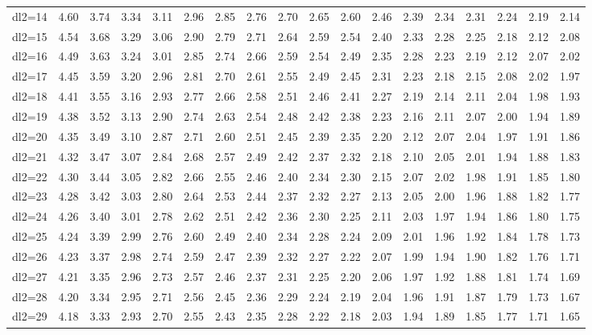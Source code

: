 \documentclass[
  11pt,
  french,
]{book}
\begin{document}
\begin{table}
\begin{tabular}[t]{lrrrrrrrrrrrrrrrrr}
dl2=14 & 4.60 & 3.74 & 3.34 & 3.11 & 2.96 & 2.85 & 2.76 & 2.70 & 2.65 & 2.60 & 2.46 & 2.39 & 2.34 & 2.31 & 2.24 & 2.19 & 2.14\\
dl2=15 & 4.54 & 3.68 & 3.29 & 3.06 & 2.90 & 2.79 & 2.71 & 2.64 & 2.59 & 2.54 & 2.40 & 2.33 & 2.28 & 2.25 & 2.18 & 2.12 & 2.08\\
\addlinespace
dl2=16 & 4.49 & 3.63 & 3.24 & 3.01 & 2.85 & 2.74 & 2.66 & 2.59 & 2.54 & 2.49 & 2.35 & 2.28 & 2.23 & 2.19 & 2.12 & 2.07 & 2.02\\
dl2=17 & 4.45 & 3.59 & 3.20 & 2.96 & 2.81 & 2.70 & 2.61 & 2.55 & 2.49 & 2.45 & 2.31 & 2.23 & 2.18 & 2.15 & 2.08 & 2.02 & 1.97\\
dl2=18 & 4.41 & 3.55 & 3.16 & 2.93 & 2.77 & 2.66 & 2.58 & 2.51 & 2.46 & 2.41 & 2.27 & 2.19 & 2.14 & 2.11 & 2.04 & 1.98 & 1.93\\
dl2=19 & 4.38 & 3.52 & 3.13 & 2.90 & 2.74 & 2.63 & 2.54 & 2.48 & 2.42 & 2.38 & 2.23 & 2.16 & 2.11 & 2.07 & 2.00 & 1.94 & 1.89\\
dl2=20 & 4.35 & 3.49 & 3.10 & 2.87 & 2.71 & 2.60 & 2.51 & 2.45 & 2.39 & 2.35 & 2.20 & 2.12 & 2.07 & 2.04 & 1.97 & 1.91 & 1.86\\
\addlinespace
dl2=21 & 4.32 & 3.47 & 3.07 & 2.84 & 2.68 & 2.57 & 2.49 & 2.42 & 2.37 & 2.32 & 2.18 & 2.10 & 2.05 & 2.01 & 1.94 & 1.88 & 1.83\\
dl2=22 & 4.30 & 3.44 & 3.05 & 2.82 & 2.66 & 2.55 & 2.46 & 2.40 & 2.34 & 2.30 & 2.15 & 2.07 & 2.02 & 1.98 & 1.91 & 1.85 & 1.80\\
dl2=23 & 4.28 & 3.42 & 3.03 & 2.80 & 2.64 & 2.53 & 2.44 & 2.37 & 2.32 & 2.27 & 2.13 & 2.05 & 2.00 & 1.96 & 1.88 & 1.82 & 1.77\\
dl2=24 & 4.26 & 3.40 & 3.01 & 2.78 & 2.62 & 2.51 & 2.42 & 2.36 & 2.30 & 2.25 & 2.11 & 2.03 & 1.97 & 1.94 & 1.86 & 1.80 & 1.75\\
dl2=25 & 4.24 & 3.39 & 2.99 & 2.76 & 2.60 & 2.49 & 2.40 & 2.34 & 2.28 & 2.24 & 2.09 & 2.01 & 1.96 & 1.92 & 1.84 & 1.78 & 1.73\\
\addlinespace
dl2=26 & 4.23 & 3.37 & 2.98 & 2.74 & 2.59 & 2.47 & 2.39 & 2.32 & 2.27 & 2.22 & 2.07 & 1.99 & 1.94 & 1.90 & 1.82 & 1.76 & 1.71\\
dl2=27 & 4.21 & 3.35 & 2.96 & 2.73 & 2.57 & 2.46 & 2.37 & 2.31 & 2.25 & 2.20 & 2.06 & 1.97 & 1.92 & 1.88 & 1.81 & 1.74 & 1.69\\
dl2=28 & 4.20 & 3.34 & 2.95 & 2.71 & 2.56 & 2.45 & 2.36 & 2.29 & 2.24 & 2.19 & 2.04 & 1.96 & 1.91 & 1.87 & 1.79 & 1.73 & 1.67\\
dl2=29 & 4.18 & 3.33 & 2.93 & 2.70 & 2.55 & 2.43 & 2.35 & 2.28 & 2.22 & 2.18 & 2.03 & 1.94 & 1.89 & 1.85 & 1.77 & 1.71 & 1.65\\

\end{tabular}
\end{table}
\end{document}
